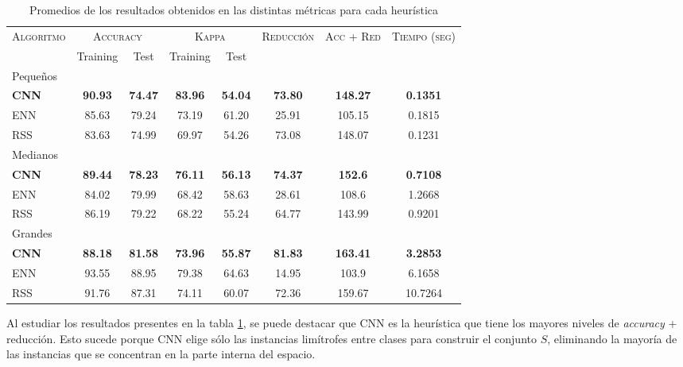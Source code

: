 \begin{table}[h!]
\centering
\begin{adjustbox}{max width =\textwidth}
\begin{tabular}{l c c c c c c c}
\hline
\multirow{2}{*}{\textsc{Algoritmo}}
	& \multicolumn{2}{c}{\textsc{Accuracy}}
	& \multicolumn{2}{c}{\textsc{Kappa}}
	& \textsc{Reducción}
	& \textsc{Acc + Red}
	& \textsc{Tiempo (seg)} \\
	& Training & Test
	& Training & Test \\ 
\hline
\hline

Pequeños\\
\textbf{CNN} & \textbf{90.93} & \textbf{74.47} & \textbf{83.96} & \textbf{54.04} & \textbf{73.80} & \textbf{148.27} & \textbf{0.1351} \\
ENN & 85.63 & 79.24 & 73.19 & 61.20 & 25.91 & 105.15 & 0.1815 \\
RSS & 83.63 & 74.99 & 69.97 & 54.26 & 73.08 & 148.07 & 0.1231 \\

\hline

Medianos\\
\textbf{CNN} & \textbf{89.44} & \textbf{78.23} & \textbf{76.11} & \textbf{56.13} & \textbf{74.37} & \textbf{152.6} & \textbf{0.7108} \\
ENN & 84.02 & 79.99 & 68.42 & 58.63 & 28.61 & 108.6 & 1.2668 \\
RSS & 86.19 & 79.22 & 68.22 & 55.24 & 64.77 & 143.99 & 0.9201 \\

\hline

Grandes\\
\textbf{CNN} & \textbf{88.18} & \textbf{81.58} & \textbf{73.96} & \textbf{55.87} & \textbf{81.83} & \textbf{163.41} & \textbf{3.2853} \\
ENN & 93.55 & 88.95 & 79.38 & 64.63 & 14.95 & 103.9 & 6.1658 \\
RSS & 91.76 & 87.31 & 74.11 & 60.07 & 72.36 & 159.67 & 10.7264 \\


\hline
\end{tabular}
\end{adjustbox}
\caption{Promedios de los resultados obtenidos en las distintas métricas para cada heurística}
\label{heu}
\end{table}

Al estudiar los resultados presentes en la tabla \ref{heu}, se puede destacar que CNN es la heurística que tiene los mayores niveles de \emph{accuracy} + reducción. Esto sucede porque CNN elige sólo las instancias limítrofes entre clases para construir el conjunto $S$, eliminando la mayoría de las instancias que se concentran en la parte interna del espacio.

